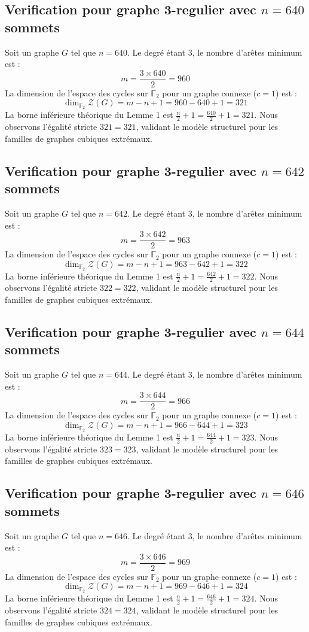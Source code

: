 \documentclass[11pt,a4paper]{article}
\begin{document}
\subsection{Verification pour graphe 3-regulier avec $n=640$ sommets}
Soit un graphe $G$ tel que $n = 640$. Le degré étant 3, le nombre d'arêtes minimum est :
$$ m = \frac{3 \times 640}{2} = 960 $$
La dimension de l'espace des cycles sur $\mathbb{F}_2$ pour un graphe connexe ($c=1$) est :
$$ \dim_{\mathbb{F}_2} \mathcal{Z}(G) = m - n + 1 = 960 - 640 + 1 = 321 $$
La borne inférieure théorique du Lemme 1 est $\frac{n}{2} + 1 = \frac{640}{2} + 1 = 321$.
Nous observons l'égalité stricte $321 = 321$, validant le modèle structurel pour les familles de graphes cubiques extrémaux.

\subsection{Verification pour graphe 3-regulier avec $n=642$ sommets}
Soit un graphe $G$ tel que $n = 642$. Le degré étant 3, le nombre d'arêtes minimum est :
$$ m = \frac{3 \times 642}{2} = 963 $$
La dimension de l'espace des cycles sur $\mathbb{F}_2$ pour un graphe connexe ($c=1$) est :
$$ \dim_{\mathbb{F}_2} \mathcal{Z}(G) = m - n + 1 = 963 - 642 + 1 = 322 $$
La borne inférieure théorique du Lemme 1 est $\frac{n}{2} + 1 = \frac{642}{2} + 1 = 322$.
Nous observons l'égalité stricte $322 = 322$, validant le modèle structurel pour les familles de graphes cubiques extrémaux.

\subsection{Verification pour graphe 3-regulier avec $n=644$ sommets}
Soit un graphe $G$ tel que $n = 644$. Le degré étant 3, le nombre d'arêtes minimum est :
$$ m = \frac{3 \times 644}{2} = 966 $$
La dimension de l'espace des cycles sur $\mathbb{F}_2$ pour un graphe connexe ($c=1$) est :
$$ \dim_{\mathbb{F}_2} \mathcal{Z}(G) = m - n + 1 = 966 - 644 + 1 = 323 $$
La borne inférieure théorique du Lemme 1 est $\frac{n}{2} + 1 = \frac{644}{2} + 1 = 323$.
Nous observons l'égalité stricte $323 = 323$, validant le modèle structurel pour les familles de graphes cubiques extrémaux.

\subsection{Verification pour graphe 3-regulier avec $n=646$ sommets}
Soit un graphe $G$ tel que $n = 646$. Le degré étant 3, le nombre d'arêtes minimum est :
$$ m = \frac{3 \times 646}{2} = 969 $$
La dimension de l'espace des cycles sur $\mathbb{F}_2$ pour un graphe connexe ($c=1$) est :
$$ \dim_{\mathbb{F}_2} \mathcal{Z}(G) = m - n + 1 = 969 - 646 + 1 = 324 $$
La borne inférieure théorique du Lemme 1 est $\frac{n}{2} + 1 = \frac{646}{2} + 1 = 324$.
Nous observons l'égalité stricte $324 = 324$, validant le modèle structurel pour les familles de graphes cubiques extrémaux.
\end{document}
